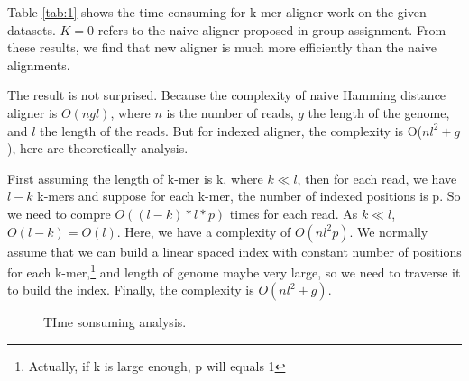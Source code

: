 \documentclass[a4paper]{article}
\begin{document}
Table \ref{tab:1} shows the time consuming for k-mer aligner work on the given datasets. $K=0$ refers to the naive aligner proposed in group assignment. From these results, we find that new aligner is much more efficiently than the naive alignments.

The result is not surprised. Because the  complexity of naive Hamming distance aligner is $O(ngl)$, where $n$ is the number of reads, $g$ the length of the genome, and $l$ the length of the reads. But for indexed aligner, the complexity is O($nl^2+g$), here are theoretically analysis.

First assuming the length of k-mer is k, where $ k\ll l$, then for each read, we have $l-k$ k-mers and suppose for each k-mer, the number of indexed positions is p. So we need to compre $O((l-k)*l*p)$ times for each read. As $k\ll l$, $O(l-k)=O(l)$. Here, we have a complexity of $O(nl^{2}p)$. We normally assume that we can build a linear spaced index with constant number of positions for each k-mer,\footnote{Actually, if k is large enough, p will equals 1} and length of genome maybe very large, so we need to traverse it to build the index. Finally, the complexity is $O(nl^{2} + g)$.

\begin{figure}[!htb]
	\centering
	\caption{TIme sonsuming analysis.}
	\label{fig:time} 
\end{figure}
\end{document}
